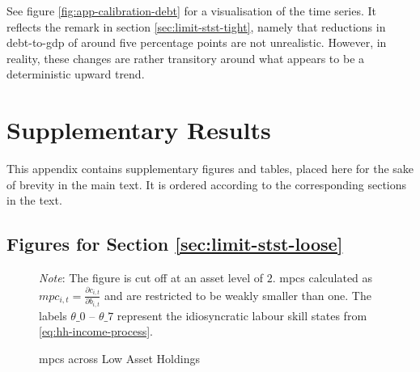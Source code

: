 \documentclass[a4paper,12pt]{article} %
\numberwithin{equation}{section} %
\numberwithin{figure}{section}
\numberwithin{table}{section}
\begin{document}
\begin{refsection}
\begin{appendices}
See figure \ref{fig:app-calibration-debt} for a visualisation of the time series. It reflects the remark in section \ref{sec:limit-stst-tight}, namely that reductions in debt-to-\Gls{gdp} of around five percentage points are not unrealistic. However, in reality, these changes are rather transitory around what appears to be a deterministic upward trend.

\section{Supplementary Results}
\label{sec-app:figures}

This appendix contains supplementary figures and tables, placed here for the sake of brevity in the main text. It is ordered according to the corresponding sections in the text.

\subsection{Figures for Section \ref{sec:limit-stst-loose}}
\label{sec-app:figures-limit-loose}

\begin{figure}[H]
    \centering
    \caption{\Gls{mpc}s across Low Asset Holdings}
    \label{fig:baseline-limit-initial-mpcs}
    

    \vspace{10pt}
    
    \begin{minipage}{0.75\textwidth}
    \footnotesize
    \textit{Note}: The figure is cut off at an asset level of $2$. \Gls{mpc}s calculated as $mpc_{i,t} = \frac{\partial c_{i,t}}{\partial b_{i,t}}$ and are restricted to be weakly smaller than one. The labels $\theta\_0$ -- $\theta\_7$ represent the idiosyncratic labour skill states from \eqref{eq:hh-income-process}.
    \end{minipage}
\end{figure}


\end{appendices}
\end{refsection}
\end{document}

